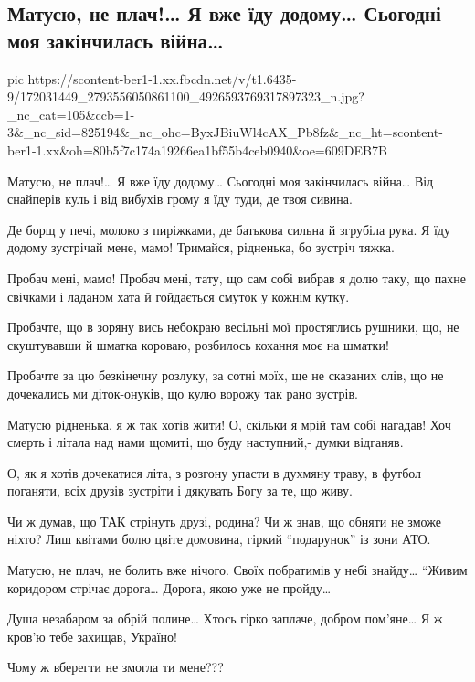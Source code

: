  
 
 
 
 

\subsection{Матусю, не плач!… Я вже їду додому… Сьогодні моя закінчилась війна…}
\label{sec:10_04_2021.fb.1.vojna}

\ifcmt
  pic https://scontent-ber1-1.xx.fbcdn.net/v/t1.6435-9/172031449_2793556050861100_4926593769317897323_n.jpg?_nc_cat=105&ccb=1-3&_nc_sid=825194&_nc_ohc=ByxJBiuWl4cAX_Pb8fz&_nc_ht=scontent-ber1-1.xx&oh=80b5f7c174a19266ea1bf55b4ceb0940&oe=609DEB7B
\fi

Матусю, не плач!… Я вже їду додому…
Сьогодні моя закінчилась війна…
Від снайперів куль і від вибухів грому
я їду туди, де твоя сивина.

Де борщ у печі, молоко з пиріжками,
де батькова сильна й згрубіла рука.
Я їду додому  зустрічай мене, мамо!
Тримайся, рідненька, бо зустріч тяжка.

Пробач мені, мамо! Пробач мені, тату,
що сам собі вибрав я долю таку,
що пахне свічками і ладаном хата
й гойдається смуток у кожнім кутку.

Пробачте, що в зоряну вись небокраю
весільні мої простяглись рушники,
що, не скуштувавши й шматка короваю,
розбилось кохання моє на шматки!

Пробачте за цю безкінечну розлуку,
за сотні моїх, ще не сказаних слів,
що не дочекались ми діток-онуків,
що кулю ворожу так рано зустрів.

Матусю рідненька, я ж так хотів жити!
О, скільки я мрій там собі нагадав!
Хоч смерть і літала над нами щомиті,
що буду наступний,- думки відганяв.

О, як я хотів дочекатися літа,
з розгону упасти в духмяну траву,
в футбол поганяти, всіх друзів зустріти
і дякувать Богу за те, що живу.

Чи ж думав, що ТАК стрінуть друзі, родина?
Чи ж знав, що обняти не зможе ніхто?
Лиш квітами болю цвіте домовина,
гіркий “подарунок” із зони АТО.

Матусю, не плач, не болить вже нічого.
Своїх побратимів у небі знайду…
“Живим коридором стрічає дорога…
Дорога, якою уже не пройду…

Душа незабаром за обрій полине…
Хтось гірко заплаче, добром пом’яне…
Я ж кров’ю тебе захищав, Україно!

Чому ж
вберегти
не змогла
ти мене???
